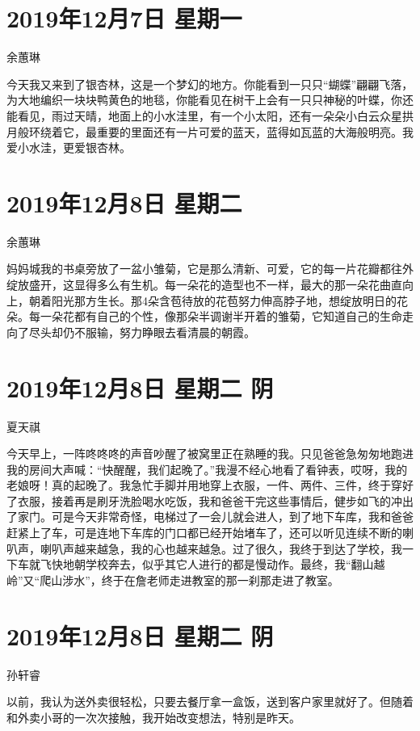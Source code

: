 \section{2019年12月7日 星期一}

余蕙琳

今天我又来到了银杏林，这是一个梦幻的地方。你能看到一只只``蝴蝶''翩翩飞落，为大地编织一块块鸭黄色的地毯，你能看见在树干上会有一只只神秘的叶蝶，你还能看见，雨过天晴，地面上的小水洼里，有一个小太阳，还有一朵朵小白云众星拱月般环绕着它，最重要的里面还有一片可爱的蓝天，蓝得如瓦蓝的大海般明亮。我爱小水洼，更爱银杏林。

\section{2019年12月8日 星期二}

余蕙琳

妈妈城我的书桌旁放了一盆小雏菊，它是那么清新、可爱，它的每一片花瓣都往外绽放盛开，这显得多么有生机。每一朵花的造型也不一样，最大的那一朵花曲直向上，朝着阳光那方生长。那4朵含苞待放的花苞努力伸高脖子地，想绽放明日的花朵。每一朵花都有自己的个性，像那朵半调谢半开着的雏菊，它知道自己的生命走向了尽头却仍不服输，努力睁眼去看清晨的朝霞。

\section{2019年12月8日 星期二 阴}

夏天祺

今天早上，一阵咚咚咚的声音吵醒了被窝里正在熟睡的我。只见爸爸急匆匆地跑进我的房间大声喊：``快醒醒，我们起晚了。''我漫不经心地看了看钟表，哎呀，我的老娘呀！真的起晚了。我急忙手脚并用地穿上衣服，一件、两件、三件，终于穿好了衣服，接着再是刷牙洗脸喝水吃饭，我和爸爸干完这些事情后，健步如飞的冲出了家门。可是今天非常奇怪，电梯过了一会儿就会进人，到了地下车库，我和爸爸赶紧上了车，可是连地下车库的门口都已经开始堵车了，还可以听见连续不断的喇叭声，喇叭声越来越急，我的心也越来越急。过了很久，我终于到达了学校，我一下车就飞快地朝学校奔去，似乎其它人进行的都是慢动作。最终，我``翻山越岭''又``爬山涉水''，终于在詹老师走进教室的那一刹那走进了教室。

\section{2019年12月8日 星期二 阴}

孙轩睿

以前，我认为送外卖很轻松，只要去餐厅拿一盒饭，送到客户家里就好了。但随着和外卖小哥的一次次接触，我开始改变想法，特别是昨天。

